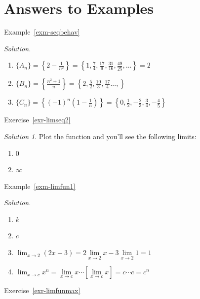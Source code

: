\documentclass[
  letterpaper,
]{book}
\providecommand{\tightlist}{%
  \setlength{\itemsep}{0pt}\setlength{\parskip}{0pt}}\usepackage{longtable,booktabs,array}
\theoremstyle{definition}
\theoremstyle{definition}
\theoremstyle{plain}
\theoremstyle{definition}
\theoremstyle{plain}
\theoremstyle{plain}
\theoremstyle{remark}
\newtheorem*{solution}{Solution}
\begin{document}
\hypertarget{answers-to-examples}{%
\section*{Answers to Examples}\label{answers-to-examples}}

Example~\ref{exm-seqbehav}

\emph{Solution.}

\begin{enumerate}
\def\labelenumi{\arabic{enumi}.}
\tightlist
\item
  \(\{A_n\}=\left\{ 2-\frac{1}{n^2} \right\} = \left\{1, \frac{7}{4}, \frac{17}{9}, \frac{31}{16}, \frac{49}{25}, \ldots\right\} = 2\)
\item
  \(\{B_n\}=\left\{\frac{n^2+1}{n} \right\} = \left\{2, \frac{5}{2}, \frac{10}{3}, \frac{17}{4}..., \right\}\)
\item
  \(\{C_n\}=\left\{(-1)^n \left(1-\frac{1}{n}\right) \right\} = \left\{0, \frac{1}{2}, -\frac{2}{3}, \frac{3}{4}, -\frac{4}{5}\right\}\)
\end{enumerate}

Exercise~\ref{exr-limseq2}

\begin{solution}

Plot the function and you'll see the following limits:

\begin{enumerate}
\def\labelenumi{\arabic{enumi}.}
\tightlist
\item
  \(0\)
\item
  \(\infty\)
\end{enumerate}

\end{solution}

Example~\ref{exm-limfun1}

\emph{Solution.}

\begin{enumerate}
\def\labelenumi{\arabic{enumi}.}
\tightlist
\item
  \(k\)
\item
  \(c\)
\item
  \(\lim_{x\to 2} (2x-3) = 2\lim\limits_{x\to 2} x - 3\lim\limits_{x\to 2} 1 = 1\)
\item
  \(\lim_{x \to c} x^n = \lim\limits_{x \to c} x \cdots[\lim\limits_{x \to c} x] = c\cdots c =c^n\)
\end{enumerate}

Exercise~\ref{exr-limfunmax}
\end{document}
